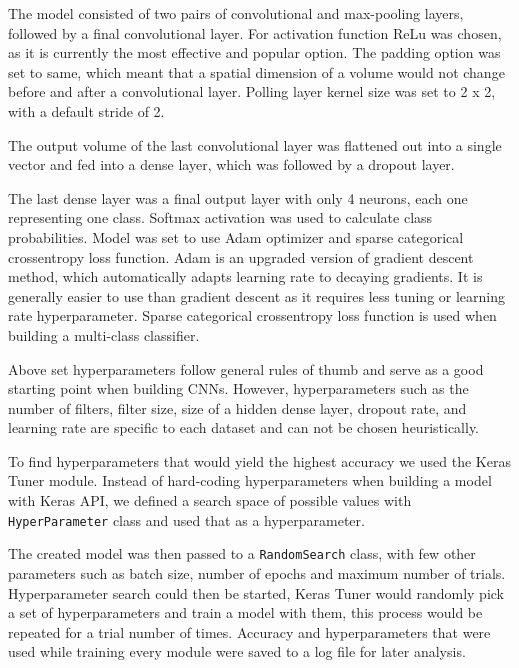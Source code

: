 The model consisted of two pairs of convolutional and max-pooling layers, followed by a final convolutional layer.
For activation function ReLu was chosen, as it is currently the most effective and popular option\cite{cs231n}\cite{geron}.
The padding option was set to same, which meant that a spatial dimension of a volume would not change before and after a convolutional layer.
Polling layer kernel size was set to 2 x 2, with a default stride of 2.

The output volume of the last convolutional layer was flattened out into a single vector and fed into a dense layer, which was followed by a dropout layer\footnotemark.


The last dense layer was a final output layer with only 4 neurons, each one representing one class.
Softmax activation was used to calculate class probabilities.
Model was set to use Adam optimizer and sparse categorical crossentropy loss function.
Adam is an upgraded version of gradient descent method, which automatically adapts learning rate to decaying gradients\cite{geron}.
It is generally easier to use than gradient descent as it requires less tuning or learning rate hyperparameter.
Sparse categorical crossentropy loss function is used when building a multi-class classifier.

Above set hyperparameters follow general rules of thumb and serve as a good starting point when building CNNs\cite{cs231n}.
However, hyperparameters such as the number of filters, filter size, size of a hidden dense layer, dropout rate, and learning rate are specific to each dataset and can not be chosen heuristically.

To find hyperparameters that would yield the highest accuracy we used the Keras Tuner module.
Instead of hard-coding hyperparameters when building a model with Keras API, we defined a search space of possible values with \verb|HyperParameter| class and used that as a hyperparameter.

The created model was then passed to a \verb|RandomSearch| class, with few other parameters such as batch size, number of epochs and maximum number of trials.
Hyperparameter search could then be started, Keras Tuner would randomly pick a set of hyperparameters and train a model with them, this process would be repeated for a trial number of times.
Accuracy and hyperparameters that were used while training every module were saved to a log file for later analysis.

